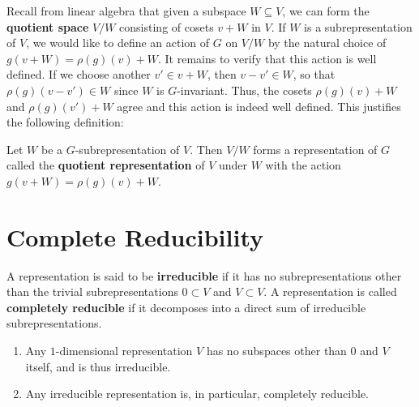 Recall from linear algebra that given a subspace $W \subseteq V$, we can form the \textbf{quotient space} $V / W$ consisting of cosets $v + W$ in $V$.  If $W$ is a subrepresentation of $V$, we would like to define an action of $G$ on $V / W$ by the natural choice of $g (v + W) = \rho(g)(v)+ W$.  It remains to verify that this action is well defined.  If we choose another $v' \in v + W$, then $v - v' \in W$, so that $\rho(g)(v - v') \in W$ since $W$ is $G$-invariant.  Thus, the cosets $\rho(g)(v) + W$ and $\rho(g)(v') + W$ agree and this action is indeed well defined. This justifies the following definition:

\begin{defn}
Let $W$ be a $G$-subrepresentation of $V$.  Then $V/W$ forms a representation of $G$ called the \textbf{quotient representation} of $V$ under $W$ with the action $g( v + W) = \rho(g)(v) + W$.
\end{defn}



\section{Complete Reducibility}
\begin{defn}
A representation is said to be \textbf{irreducible} if it has no subrepresentations other than the trivial subrepresentations $ 0 \subset V$ and $V \subset V$.  A representation is called \textbf{completely reducible} if it decomposes into a direct sum of irreducible subrepresentations.
\end{defn}

\begin{note}
\begin{enumerate}
\item Any $1$-dimensional representation $V$ has no subspaces other than $0$ and $V$ itself, and is thus irreducible.
\item Any irreducible representation is, in particular, completely reducible.
\end{enumerate}
\end{note}

